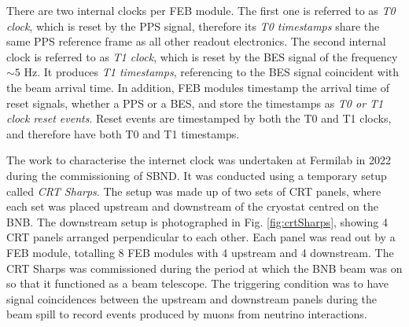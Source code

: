 There are two internal clocks per FEB module.
The first one is referred to as \textit{T0 clock}, which is reset by the PPS signal, therefore its \textit{T0 timestamps} share the same PPS reference frame as all other readout electronics.
The second internal clock is referred to as \textit{T1 clock}, which is reset by the BES signal of the frequency $\sim 5$ Hz. 
It produces \textit{T1 timestamps}, referencing to the BES signal coincident with the beam arrival time.
In addition, FEB modules timestamp the arrival time of reset signals, whether a PPS or a BES, and store the timestamps as \textit{T0 or T1 clock reset events}.
Reset events are timestamped by both the T0 and T1 clocks, and therefore have both T0 and T1 timestamps.




The work to characterise the internet clock was undertaken at Fermilab in 2022 during the commissioning of SBND.
It was conducted using a temporary setup called \textit{CRT Sharps}.
The setup was made up of two sets of CRT panels, where each set was placed upstream and downstream of the cryostat centred on the BNB.
The downstream setup is photographed in Fig. \ref{fig:crtSharps}, showing 4 CRT panels arranged perpendicular to each other.
Each panel was read out by a FEB module, totalling 8 FEB modules with 4 upstream and 4 downstream.
The CRT Sharps was commissioned during the period at which the BNB beam was on so that it functioned as a beam telescope.
The triggering condition was to have signal coincidences between the upstream and downstream panels during the beam spill to record events produced by muons from neutrino interactions.

